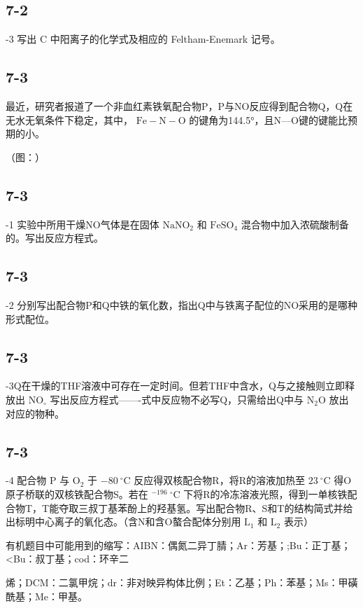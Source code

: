 \subsection*{7-2}
-3 写出 C 中阳离⼦的化学式及相应的 Feltham-Enemark 记号。

\subsection*{7-3}
最近，研究者报道了⼀个⾮⾎红素铁氧配合物P，P与NO反应得到配合物Q，Q在⽆⽔⽆氧条件下稳定，其中， $\mathrm { F e { - } N { - } O }$ 的键⻆为144.5°，且N—O键的键能⽐预期的⼩。

（图：）

\subsection*{7-3}
-1 实验中所⽤⼲燥NO⽓体是在固体 $\mathrm { N a N O _ { 2 } }$ 和 $\mathrm { F e S O _ { 4 } }$ 混合物中加⼊浓硫酸制备的。写出反应⽅程式。

\subsection*{7-3}
-2 分别写出配合物P和Q中铁的氧化数，指出Q中与铁离⼦配位的NO采⽤的是哪种形式配位。

\subsection*{7-3}
-3Q在⼲燥的THF溶液中可存在⼀定时间。但若THF中含⽔，Q与之接触则⽴即释放出 $\mathrm { N O } _ { \circ }$ 写出反应⽅程式——-式中反应物不必写Q，只需给出Q中与 $\mathrm { N } _ { 2 } \mathrm { O }$ 放出对应的物种。

\subsection*{7-3}
-4 配合物 P 与 $\mathrm { O _ { 2 } }$ 于 $- 8 0 ~ ^ { \circ } \mathrm { C }$ 反应得双核配合物R，将R的溶液加热⾄ $2 3 ~ ^ { \circ } \mathrm { C }$ 得O原⼦桥联的双核铁配合物S。若在 $^ { - 1 9 6 } \ ^ { \circ } \mathrm { C }$ 下将R的冷冻溶液光照，得到⼀单核铁配合物T，T能夺取三叔丁基苯酚上的羟基氢。写出配合物R、S和T的结构简式并给出标明中⼼离⼦的氧化态。（含N和含O螯合配体分别⽤ $\mathrm { L _ { 1 } }$ 和 $\mathrm { L } _ { 2 }$ 表⽰）

有机题⽬中可能⽤到的缩写：AIBN：偶氮⼆异丁腈；Ar：芳基；;Bu：正丁基；<Bu：叔丁基；cod：环⾟⼆

烯；DCM：⼆氯甲烷；dr：⾮对映异构体⽐例；Et：⼄基；Ph：苯基；Ms：甲磺酰基；Me：甲基。

